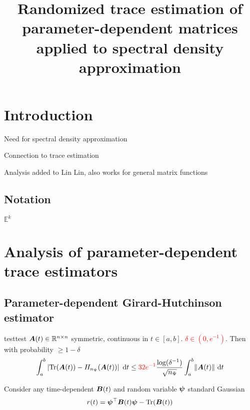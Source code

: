 \documentclass[12pt]{article}
\title{Randomized trace estimation of parameter-dependent matrices applied to spectral density approximation}
\begin{document}
\maketitle

\section{Introduction}
\label{sec:introduction}

Need for spectral density approximation

Connection to trace estimation

Analysis added to Lin Lin, also works for general matrix functions

\subsection{Notation}

$\mathbb{E}^{k}$

\section{Analysis of parameter-dependent trace estimators}
\label{sec:analysis}

\subsection{Parameter-dependent Girard-Hutchinson estimator}
\label{subsec:hutchinson}

\begin{theorem}{test}{test}
    $\boldsymbol{A}(t) \in \mathbb{R}^{n \times n}$ symmetric, continuous in $t \in [a, b]$.
    \textcolor{red}{$\delta \in (0, e^{-1})$}. Then with probability $\geq 1 - \delta$
    \begin{equation}
        \int_{a}^{b} \left| \operatorname{Tr}(\boldsymbol{A}(t)) - H_{n_{\Psi}}(\boldsymbol{A}(t)) \right| ~\mathrm{d}t \leq \textcolor{red}{32e^{-1}} \frac{\log(\delta^{-1})}{\sqrt{n_{\Psi}}} \int_{a}^{b} \lVert \boldsymbol{A}(t) \rVert  ~\mathrm{d}t
    \end{equation}
\end{theorem}

Consider any time-dependent $\boldsymbol{B}(t)$ and random variable $\boldsymbol{\psi}$ standard Gaussian
\begin{equation}
    r(t) = \boldsymbol{\psi}^{\top} \boldsymbol{B}(t) \boldsymbol{\psi} - \operatorname{Tr}(\boldsymbol{B}(t))
\end{equation}
\end{document}
